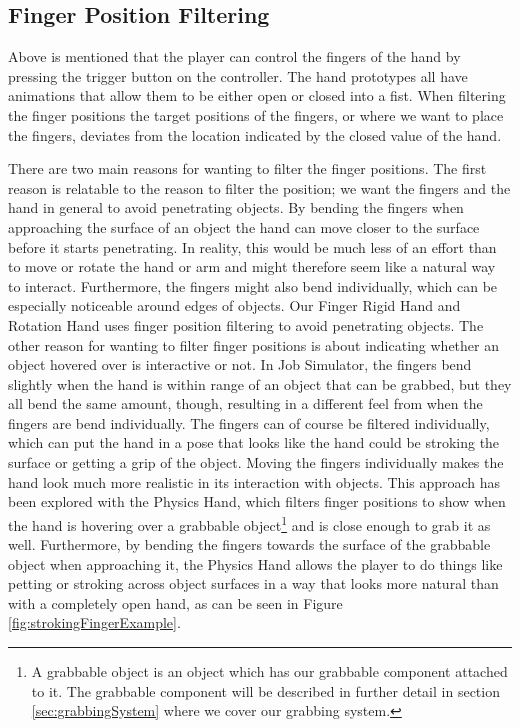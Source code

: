 \subsection{Finger Position Filtering}
\label{subsec:categoryFingerFiltering}
Above is mentioned that the player can control the fingers of the hand by pressing the trigger button on the controller. The hand prototypes all have animations that allow them to be either open or closed into a fist. When filtering the finger positions the target positions of the fingers, or where we want to place the fingers, deviates from the location indicated by the closed value of the hand.

There are two main reasons for wanting to filter the finger positions. The first reason is relatable to the reason to filter the position; we want the fingers and the hand in general to avoid penetrating objects. By bending the fingers when approaching the surface of an object the hand can move closer to the surface before it starts penetrating. In reality, this would be much less of an effort than to move or rotate the hand or arm and might therefore seem like a natural way to interact. Furthermore, the fingers might also bend individually, which can be especially noticeable around edges of objects. Our Finger Rigid Hand and Rotation Hand uses finger position filtering to avoid penetrating objects. The other reason for wanting to filter finger positions is about indicating whether an object hovered over is interactive or not. In Job Simulator, the fingers bend slightly when the hand is within range of an object that can be grabbed, but they all bend the same amount, though, resulting in a different feel from when the fingers are bend individually. The fingers can of course be filtered individually, which can put the hand in a pose that looks like the hand could be stroking the surface or getting a grip of the object. Moving the fingers individually makes the hand look much more realistic in its interaction with objects. This approach has been explored with the Physics Hand, which filters finger positions to show when the hand is hovering over a grabbable object\footnote{A grabbable object is an object which has our grabbable component attached to it. The grabbable component will be described in further detail in section \ref{sec:grabbingSystem} where we cover our grabbing system.} and is close enough to grab it as well. Furthermore, by bending the fingers towards the surface of the grabbable object when approaching it, the Physics Hand allows the player to do things like petting or stroking across object surfaces in a way that looks more natural than with a completely open hand, as can be seen in Figure \ref{fig:strokingFingerExample}.

